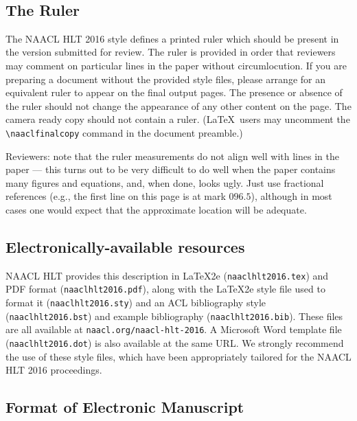 \documentclass[11pt,letterpaper]{article}
\begin{document}
\pagebreak
~
\pagebreak

\subsection{The Ruler}
The NAACL HLT 2016 style defines a printed ruler which should be present in the
version submitted for review.  The ruler is provided in order that
reviewers may comment on particular lines in the paper without
circumlocution.  If you are preparing a document without the provided
style files, please arrange for an equivalent ruler to
appear on the final output pages.  The presence or absence of the ruler
should not change the appearance of any other content on the page.  The
camera ready copy should not contain a ruler. (\LaTeX\ users may uncomment
the {\small\verb|\naaclfinalcopy|} command in the document preamble.)  

Reviewers:
note that the ruler measurements do not align well with lines in the paper
--- this turns out to be very difficult to do well when the paper contains
many figures and equations, and, when done, looks ugly.  Just use fractional
references (e.g., the first line on this page is at mark $096.5$), although in most cases one would
expect that the approximate location will be adequate.

\subsection{Electronically-available resources}

NAACL HLT provides this description in \LaTeX2e{} ({\small\tt naaclhlt2016.tex}) and PDF
format ({\small\tt naaclhlt2016.pdf}), along with the \LaTeX2e{} style file used to
format it ({\small\tt naaclhlt2016.sty}) and an ACL bibliography style ({\small\tt naaclhlt2016.bst})
and example bibliography ({\small\tt naaclhlt2016.bib}).
These files are all available at
{\small\tt naacl.org/naacl-hlt-2016}.  A Microsoft Word
template file ({\small\tt naaclhlt2016.dot}) is also available at the same URL. We
strongly recommend the use of these style files, which have been
appropriately tailored for the NAACL HLT 2016 proceedings.

\subsection{Format of Electronic Manuscript}
\label{sect:pdf}
\end{document}
